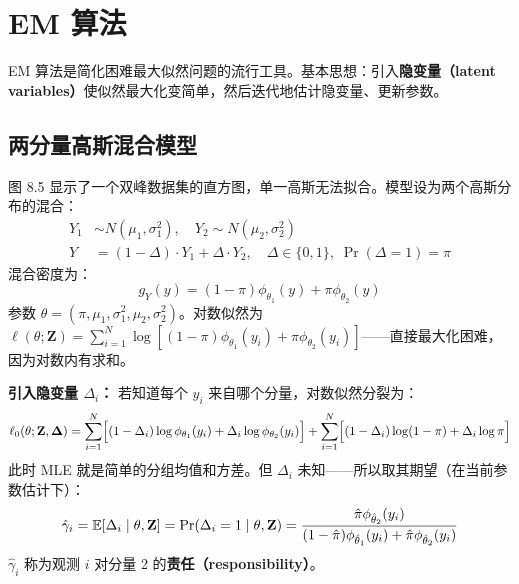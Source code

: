 \section{EM 算法}

EM 算法是简化困难最大似然问题的流行工具。基本思想：引入\textbf{隐变量（latent variables）}使似然最大化变简单，然后迭代地估计隐变量、更新参数。

\subsection{两分量高斯混合模型}

图 8.5 显示了一个双峰数据集的直方图，单一高斯无法拟合。模型设为两个高斯分布的混合：
\begin{equation}\label{eq:mix_model}
    \begin{aligned}
        Y_1 &\sim N(\mu_1, \sigma_1^2),\quad Y_2 \sim N(\mu_2, \sigma_2^2) \\
        Y &= (1-\Delta)\cdot Y_1 + \Delta\cdot Y_2,\quad \Delta \in \{0,1\},\; \Pr(\Delta=1)=\pi
    \end{aligned}
\end{equation}
混合密度为：
\begin{equation}\label{eq:mix_density}
    g_Y(y) = (1-\pi)\phi_{\theta_1}(y) + \pi\phi_{\theta_2}(y)
\end{equation}
参数 $\theta = (\pi, \mu_1, \sigma_1^2, \mu_2, \sigma_2^2)$。对数似然为 $\ell(\theta; \mathbf{Z}) = \sum_{i=1}^{N} \log[(1-\pi)\phi_{\theta_1}(y_i) + \pi\phi_{\theta_2}(y_i)]$——直接最大化困难，因为对数内有求和。

\textbf{引入隐变量 $\Delta_i$：} 若知道每个 $y_i$ 来自哪个分量，对数似然分裂为：
\begin{equation}\label{eq:complete_lik}
    \ell_0(\theta; \mathbf{Z}, \bm{\Delta}) = \sum_{i=1}^{N}\Bigl[(1-\Delta_i)\log\phi_{\theta_1}(y_i) + \Delta_i\log\phi_{\theta_2}(y_i)\Bigr] + \sum_{i=1}^{N}\Bigl[(1-\Delta_i)\log(1-\pi) + \Delta_i\log\pi\Bigr]
\end{equation}
此时 MLE 就是简单的分组均值和方差。但 $\Delta_i$ 未知——所以取其期望（在当前参数估计下）：
\begin{equation}\label{eq:responsibility}
    \hat{\gamma}_i = \mathbb{E}[\Delta_i \mid \theta, \mathbf{Z}] = \Pr(\Delta_i=1 \mid \theta, \mathbf{Z}) = \frac{\hat{\pi}\phi_{\hat{\theta}_2}(y_i)}{(1-\hat{\pi})\phi_{\hat{\theta}_1}(y_i) + \hat{\pi}\phi_{\hat{\theta}_2}(y_i)}
\end{equation}
$\hat{\gamma}_i$ 称为观测 $i$ 对分量 2 的\textbf{责任（responsibility）}。

